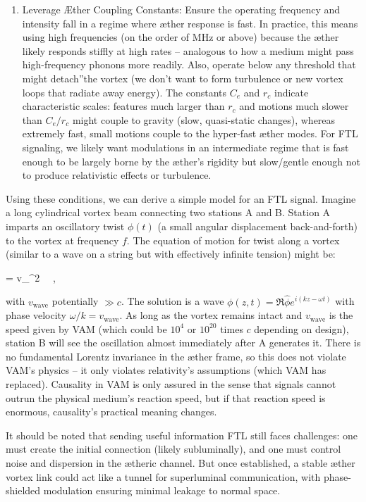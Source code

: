 \begin{enumerate}
\item 
Leverage Æther Coupling Constants: Ensure the operating frequency and intensity fall in a regime where æther response is fast. In practice, this means using high frequencies (on the order of MHz or above) because the æther likely responds stiffly at high rates – analogous to how a medium might pass high-frequency phonons more readily. Also, operate below any threshold that might \grqq detach\textquotedblright the vortex (we don't want to form turbulence or new vortex loops that radiate away energy). The constants $C_e$ and $r_c$ indicate characteristic scales: features much larger than $r_c$ and motions much slower than $C_e/r_c$ might couple to gravity (slow, quasi-static changes), whereas extremely fast, small motions couple to the hyper-fast æther modes. For FTL signaling, we likely want modulations in an intermediate regime that is fast enough to be largely borne by the æther's rigidity but slow/gentle enough not to produce relativistic effects or turbulence.




\end{enumerate}

Using these conditions, we can derive a simple model for an FTL signal. Imagine a long cylindrical vortex beam connecting two stations A and B. Station A imparts an oscillatory twist $\phi(t)$ (a small angular displacement back-and-forth) to the vortex at frequency $f$. The equation of motion for twist along a vortex (similar to a wave on a string but with effectively infinite tension) might be:


  = v_^2 \, ~, 


with $v_\text{wave}$ potentially $\gg c$. The solution is a wave $\phi(z,t) = \Re{\hat{\phi} e^{i(kz - \omega t)}}$ with phase velocity $\omega/k = v_\text{wave}$. As long as the vortex remains intact and $v_\text{wave}$ is the speed given by VAM (which could be $10^4$ or $10^{20}$ times $c$ depending on design), station B will see the oscillation almost immediately after A generates it. There is no fundamental Lorentz invariance in the æther frame, so this does not violate VAM's physics – it only violates relativity's assumptions (which VAM has replaced). Causality in VAM is only assured in the sense that signals cannot outrun the physical medium's reaction speed, but if that reaction speed is enormous, causality's practical meaning changes.


It should be noted that sending useful information FTL still faces challenges: one must create the initial connection (likely subluminally), and one must control noise and dispersion in the ætheric channel. But once established, a stable æther vortex link could act like a tunnel for superluminal communication, with phase-shielded modulation ensuring minimal leakage to normal space.


